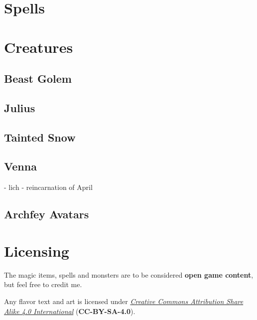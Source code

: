 \documentclass[letter,10pt,twocolumn,openany]{dndbook}
\begin{document}




\chapter{Spells}


\chapter{Creatures}

\section{Beast Golem}
\section{Julius}
\section{Tainted Snow}
\section{Venna}
- lich
- reincarnation of April

\section{Archfey Avatars}


\backmatter

\chapter{Licensing}

The magic items, spells and monsters are to be considered \textbf{open game content}, but feel free to credit me.

Any flavor text and art is licensed under \href{https://creativecommons.org/licenses/by-sa/4.0/legalcode}{\textit{Creative Commons Attribution Share Alike 4.0 International}} (\textbf{CC-BY-SA-4.0}).
\end{document}
